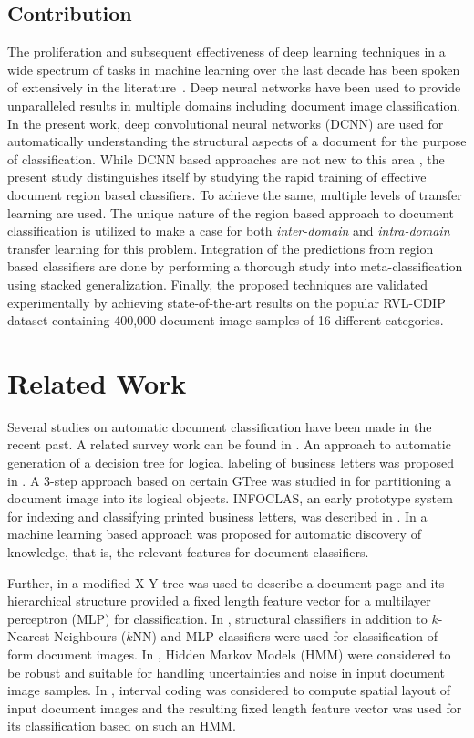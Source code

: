 \documentclass[10pt,conference,a4paper]{IEEEtran}
\begin{document}
\subsection{Contribution}
The proliferation and subsequent effectiveness of deep learning techniques in a wide spectrum of tasks in machine learning over the last decade has been spoken of extensively in the literature~\cite{schmidhuber2015deep,lecun2015deep}. Deep neural networks have been used to provide unparalleled results in multiple domains including document image classification. In the present work, deep convolutional neural networks (DCNN) are used for automatically understanding the structural aspects of a document for the purpose of classification. While DCNN based approaches are not new to this area \cite{kang2014, afzal2015, harley2015evaluation}, the present study distinguishes itself by studying the rapid training of effective document region based classifiers. To achieve the same, multiple levels of transfer learning are used. The unique nature of the region based approach to document classification is utilized to make a case for both \textit{inter-domain} and \textit{intra-domain} transfer learning for this problem. Integration of the predictions from region based classifiers are done by performing a thorough study into meta-classification using stacked generalization. Finally, the proposed techniques are validated experimentally by achieving state-of-the-art results on the popular RVL-CDIP dataset containing 400,000 document image samples of 16 different categories.


\section{Related Work}


Several studies on automatic document classification have been made in the recent past. A related survey work can be found in \cite{chen2007}. An approach to automatic generation of a decision tree for logical labeling of business letters was proposed in \cite{dengel1993}. A 3-step approach based on certain GTree was studied in \cite{dengel1994} for partitioning a document image into its logical objects. INFOCLAS, an early prototype system  for indexing and classifying printed business letters, was described in \cite{Hoch1994}. In \cite{Junker1997} a machine learning based approach was proposed for automatic discovery of knowledge, that is, the relevant features for document classifiers.


Further, in \cite{cesarini2001} a modified X-Y tree was used to describe a document page and its hierarchical structure provided a fixed length feature vector for a multilayer perceptron (MLP) for classification. In \cite{heroux1998}, structural classifiers in addition to $k$-Nearest Neighbours ($k$NN) and MLP classifiers were used for classification of form document images. In \cite{rabiner1990}, Hidden Markov Models (HMM) were considered to be robust and suitable for handling uncertainties and noise in input document image samples. In \cite{hu2000}, interval coding was considered to compute spatial layout of input document images and the resulting fixed length feature vector was used for its classification based on such an HMM.
\end{document}
